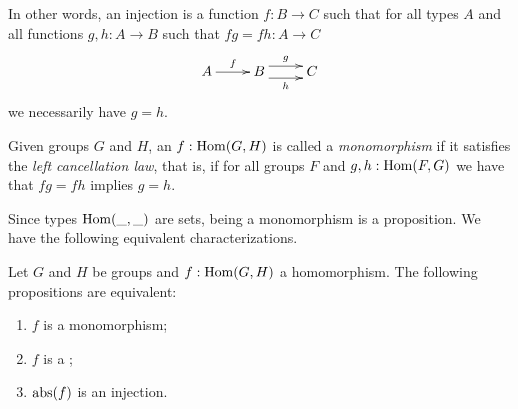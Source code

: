 In other words, an injection is a function $f:B\to C$ such that for all types $A$ and all functions $g,h:A\to B$ such that $fg=fh:A\to C$ 
$$\xymatrix{A\ar[r]^f&B\ar@<1ex>[r]^g\ar@<-1ex>[r]_h&C}$$
we necessarily have $g=h$.


\begin{definition}\label{def:monomorphism}
Given groups $G$ and $H$, an $f: \mathrm{Hom}(G,H)$ is called a 
\emph{monomorphism} if it satisfies the \emph{left cancellation law}, 
that is, if for all groups $F$ and $g,h:\mathrm{Hom}(F,G)$ we have that $fg=fh$ implies $g=h$.
\end{definition}

Since types $\mathrm{Hom}(\_,\_)$ are sets, being a monomorphism is a proposition.
We have the following equivalent characterizations.

\begin{lemma}\label{lem:eq-mono-cover}
Let $G$ and $H$ be groups and $f: \mathrm{Hom}(G,H)$ a homomorphism.
The following propositions are equivalent: %
\begin{enumerate}
\item\label{it:mono} $f$ is a monomorphism;
\item\label{it:cover} $f$ is a \covering;
\item\label{it:injection} $\mathrm{abs}(f)$ is an injection.
\end{enumerate}
\end{lemma}
